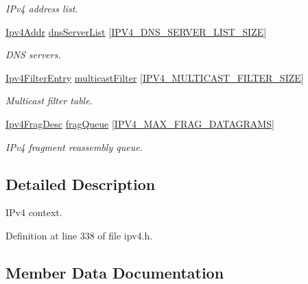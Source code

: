 \begin{DoxyCompactItemize}
\begin{DoxyCompactList}\small\item\em I\+Pv4 address list. \end{DoxyCompactList}\item 
\hyperlink{ipv4_8h_a411debb3d770caa0c06d3f73367da37f}{Ipv4\+Addr} \hyperlink{structIpv4Context_a35af49229f86907500e3d181a95568be}{dns\+Server\+List} \mbox{[}\hyperlink{ipv4_8h_abc304c5d041be75e0bbe48aa44523487}{I\+P\+V4\+\_\+\+D\+N\+S\+\_\+\+S\+E\+R\+V\+E\+R\+\_\+\+L\+I\+S\+T\+\_\+\+S\+I\+ZE}\mbox{]}
\begin{DoxyCompactList}\small\item\em D\+NS servers. \end{DoxyCompactList}\item 
\hyperlink{structIpv4FilterEntry}{Ipv4\+Filter\+Entry} \hyperlink{structIpv4Context_a2f2ef3a66b5ad28d0080380b074a95ad}{multicast\+Filter} \mbox{[}\hyperlink{net__config_8h_abad540441745129e90052cdfd1b27943}{I\+P\+V4\+\_\+\+M\+U\+L\+T\+I\+C\+A\+S\+T\+\_\+\+F\+I\+L\+T\+E\+R\+\_\+\+S\+I\+ZE}\mbox{]}
\begin{DoxyCompactList}\small\item\em Multicast filter table. \end{DoxyCompactList}\item 
\hyperlink{structIpv4FragDesc}{Ipv4\+Frag\+Desc} \hyperlink{structIpv4Context_a771c0a58c87d94217cf62b8872de1215}{frag\+Queue} \mbox{[}\hyperlink{net__config_8h_a007e85abc30c64c635bd354573ccb669}{I\+P\+V4\+\_\+\+M\+A\+X\+\_\+\+F\+R\+A\+G\+\_\+\+D\+A\+T\+A\+G\+R\+A\+MS}\mbox{]}
\begin{DoxyCompactList}\small\item\em I\+Pv4 fragment reassembly queue. \end{DoxyCompactList}\end{DoxyCompactItemize}


\subsection{Detailed Description}
I\+Pv4 context. 

Definition at line 338 of file ipv4.\+h.



\subsection{Member Data Documentation}
\mbox{\label{structIpv4Context_afa460f63677873896a3d223597316dbd}} 
